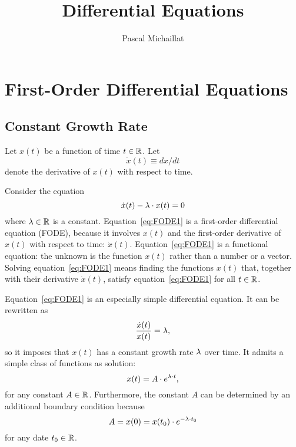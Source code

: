 \documentclass[letterpaper,12pt,leqno]{article}
\begin{document}
\title{Differential Equations}
\author{Pascal Michaillat}
\date{}

\begin{titlepage}
\maketitle
\tableofcontents
\end{titlepage}

\section{First-Order Differential Equations}\label{sec:one}

\subsection{Constant Growth Rate}

Let $x(t)$ be a function of time $t\in\mathbb{R}$. Let \[\dot{x}(t)\equiv dx/dt\] denote the derivative of $x(t)$ with respect to time. 

Consider the equation 
\begin{equation}
\dot{x}(t) -\lambda\cdot x(t) = 0
\label{eq:FODE1}\end{equation}
where $\lambda\in\mathbb{R}$ is a constant. Equation~\eqref{eq:FODE1} is a first-order differential equation (FODE), because it involves $x(t)$ and the first-order derivative of $x(t)$ with respect to time: $\dot{x}(t)$.  Equation~\eqref{eq:FODE1} is a functional equation: the unknown is the function $x(t)$ rather than a number or a vector. Solving equation~\eqref{eq:FODE1} means finding the functions $x(t)$ that, together with their derivative $\dot{x}(t)$, satisfy equation~\eqref{eq:FODE1} for all $t \in \mathbb{R}$.

Equation~\eqref{eq:FODE1} is an especially simple differential equation. It can be rewritten as 
\[\frac{\dot{x}(t)}{x(t)}= \lambda,\]
so it imposes that $x(t)$ has a constant growth rate $\lambda$ over time. It admits a simple class of functions as solution:
\begin{equation}
x(t) =A\cdot  e^{\lambda \cdot t} \label{eq:FODE1sol},
\end{equation}
for any constant $A\in \mathbb{R}$. Furthermore, the constant $A$ can be determined by an additional boundary condition because
\[A=x(0)=x(t_{0})\cdot e^{-\lambda \cdot t_{0}}\]
for any date $t_{0}\in \mathbb{R}$.
\end{document}
